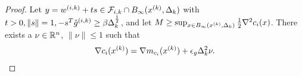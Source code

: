\begin{proof}

Let $y = {w^{(i, k)}} + ts \in {\mathcal F_{i, k}} \cap B_{\infty}({x^{(k)}}, \Delta_k) $ with $t > 0, \|s\| = 1, -s^T{{\hat g}^{(i, k)}} \ge \beta \Delta_k^{\frac 1 2}$, and let $M \ge \sup_{x \in B_{\infty}({x^{(k)}}, \Delta_k)} \frac 1 2 \nabla^2 c_i(x)$.
There exists a $\nu \in {\mathbb R^{n}}$, $\|\nu\|\le 1$ such that 
\begin{align*}
\nabla c_i({x^{(k)}}) = \nabla m_{c_i}({x^{(k)}}) + \epsilon_{g}\Delta_k^2\nu.
\end{align*}

% 
% 

\end{proof}
